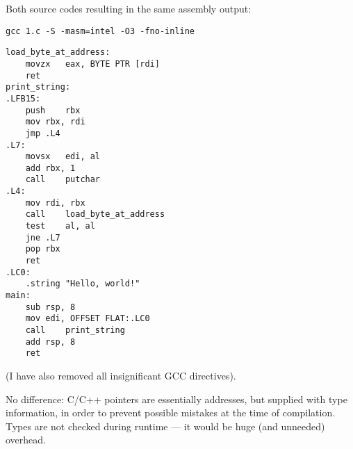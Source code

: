 Both source codes resulting in the same assembly output:

\begin{lstlisting}
gcc 1.c -S -masm=intel -O3 -fno-inline
\end{lstlisting}

\begin{lstlisting}[style=customasm]
load_byte_at_address:
	movzx	eax, BYTE PTR [rdi]
	ret
print_string:
.LFB15:
	push	rbx
	mov	rbx, rdi
	jmp	.L4
.L7:
	movsx	edi, al
	add	rbx, 1
	call	putchar
.L4:
	mov	rdi, rbx
	call	load_byte_at_address
	test	al, al
	jne	.L7
	pop	rbx
	ret
.LC0:
	.string	"Hello, world!"
main:
	sub	rsp, 8
	mov	edi, OFFSET FLAT:.LC0
	call	print_string
	add	rsp, 8
	ret
\end{lstlisting}

(I have also removed all insignificant GCC directives).

No difference: C/C++ pointers are essentially addresses, but supplied with type information, in order to prevent possible mistakes at the time of compilation.
Types are not checked during runtime --- it would be huge (and unneeded) overhead.

